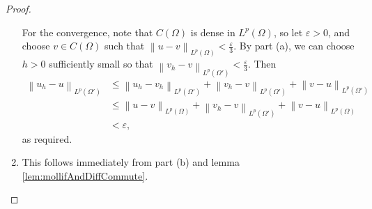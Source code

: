 \documentclass{book}
\renewcommand{\epsilon}{\varepsilon}
\newcommand{\norm}[1]{\left\lVert {#1} \right\rVert}
\theoremstyle{definition}
\numberwithin{equation}{chapter}
\begin{document}
\begin{proof}
\begin{enumerate}[label=(\alph*)]
    For the convergence, note that $C(\Omega)$ is dense in $L^p(\Omega)$, so let $\epsilon > 0$, and choose $v \in C(\Omega)$ such that $\norm{u - v}_{L^p(\Omega)} < \frac{\epsilon}{3}$. By part (a), we can choose $h > 0$ sufficiently small so that $\norm{v_h - v}_{L^p(\Omega')} < \frac{\epsilon}{3}$. Then
    \begin{equation} \begin{aligned}
        \norm{u_h - u}_{L^p(\Omega')}
        &\leq \norm{u_h - v_h}_{L^p(\Omega')} + \norm{v_h - v}_{L^p(\Omega')} + \norm{v - u}_{L^p(\Omega')} \\
        &\leq \norm{u - v}_{L^p(\Omega)} + \norm{v_h - v}_{L^p(\Omega')} + \norm{v - u}_{L^p(\Omega)} \\
        &< \epsilon,
    \end{aligned} \end{equation}
    as required.

    \item This follows immediately from part (b) and lemma \ref{lem:mollifAndDiffCommute}.
\end{enumerate} \end{proof}
\end{document}

